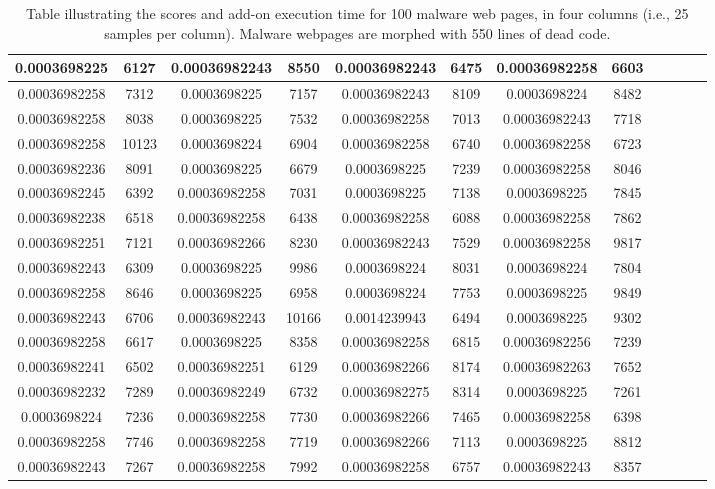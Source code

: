 \begin {table}[h]
\begin{tabular}{|c|c|c|c|c|c|c|c|c|c|c|c|}
\midrule
0.0003698225&6127&0.00036982243&8550&0.00036982243&6475&0.00036982258&6603\\
\midrule
0.00036982258&7312&0.0003698225&7157&0.00036982243&8109&0.0003698224&8482\\
\midrule
0.00036982258&8038&0.0003698225&7532&0.00036982258&7013&0.00036982243&7718\\
\midrule
0.00036982258&10123&0.0003698224&6904&0.00036982258&6740&0.00036982258&6723\\
\midrule
0.00036982236&8091&0.0003698225&6679&0.0003698225&7239&0.00036982258&8046\\
\midrule
0.00036982245&6392&0.00036982258&7031&0.0003698225&7138&0.0003698225&7845\\
\midrule
0.00036982238&6518&0.00036982258&6438&0.00036982258&6088&0.00036982258&7862\\
\midrule
0.00036982251&7121&0.00036982266&8230&0.00036982243&7529&0.00036982258&9817\\
\midrule
0.00036982243&6309&0.0003698225&9986&0.0003698224&8031&0.0003698224&7804\\
\midrule
0.00036982258&8646&0.0003698225&6958&0.0003698224&7753&0.0003698225&9849\\
\midrule
0.00036982243&6706&0.00036982243&10166&0.0014239943&6494&0.0003698225&9302\\
\midrule
0.00036982258&6617&0.0003698225&8358&0.00036982258&6815&0.00036982256&7239\\
\midrule
0.00036982241&6502&0.00036982251&6129&0.00036982266&8174&0.00036982263&7652\\
\midrule
0.00036982232&7289&0.00036982249&6732&0.00036982275&8314&0.0003698225&7261\\
\midrule
0.0003698224&7236&0.00036982258&7730&0.00036982266&7465&0.00036982258&6398\\
\midrule
0.00036982258&7746&0.00036982258&7719&0.00036982266&7113&0.0003698225&8812\\
\midrule
0.00036982243&7267&0.00036982258&7992&0.00036982258&6757&0.00036982243&8357\\
\midrule
\end{tabular}
\caption[Scores table of malware web pages]{Table illustrating the scores and add-on execution time for 100 malware web pages, in four columns (i.e., 25 samples per column). Malware webpages are morphed with 550 lines of dead code. }\label{tab:m500table}    
\end{table}

